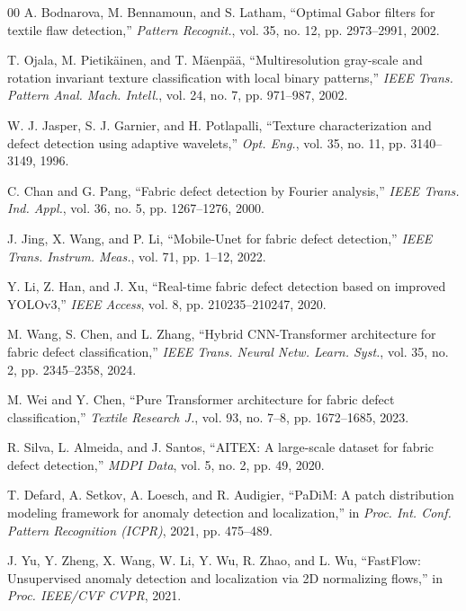 \documentclass[journal]{IEEEtran}
\begin{document}
\begin{thebibliography}{00}
A. Bodnarova, M. Bennamoun, and S. Latham, ``Optimal Gabor filters for textile flaw detection,'' \textit{Pattern Recognit.}, vol. 35, no. 12, pp. 2973--2991, 2002.

T. Ojala, M. Pietik\"ainen, and T. M\"aenp\"a\"a, ``Multiresolution gray-scale and rotation invariant texture classification with local binary patterns,'' \textit{IEEE Trans. Pattern Anal. Mach. Intell.}, vol. 24, no. 7, pp. 971--987, 2002.

W. J. Jasper, S. J. Garnier, and H. Potlapalli, ``Texture characterization and defect detection using adaptive wavelets,'' \textit{Opt. Eng.}, vol. 35, no. 11, pp. 3140--3149, 1996.

C. Chan and G. Pang, ``Fabric defect detection by Fourier analysis,'' \textit{IEEE Trans. Ind. Appl.}, vol. 36, no. 5, pp. 1267--1276, 2000.

J. Jing, X. Wang, and P. Li, ``Mobile-Unet for fabric defect detection,'' \textit{IEEE Trans. Instrum. Meas.}, vol. 71, pp. 1--12, 2022.

Y. Li, Z. Han, and J. Xu, ``Real-time fabric defect detection based on improved YOLOv3,'' \textit{IEEE Access}, vol. 8, pp. 210235--210247, 2020.

M. Wang, S. Chen, and L. Zhang, ``Hybrid CNN-Transformer architecture for fabric defect classification,'' \textit{IEEE Trans. Neural Netw. Learn. Syst.}, vol. 35, no. 2, pp. 2345--2358, 2024.

M. Wei and Y. Chen, ``Pure Transformer architecture for fabric defect classification,'' \textit{Textile Research J.}, vol. 93, no. 7--8, pp. 1672--1685, 2023.

R. Silva, L. Almeida, and J. Santos, ``AITEX: A large-scale dataset for fabric defect detection,'' \textit{MDPI Data}, vol. 5, no. 2, pp. 49, 2020.

T. Defard, A. Setkov, A. Loesch, and R. Audigier, ``PaDiM: A patch distribution modeling framework for anomaly detection and localization,'' in \textit{Proc. Int. Conf. Pattern Recognition (ICPR)}, 2021, pp. 475--489.

J. Yu, Y. Zheng, X. Wang, W. Li, Y. Wu, R. Zhao, and L. Wu, ``FastFlow: Unsupervised anomaly detection and localization via 2D normalizing flows,'' in \textit{Proc. IEEE/CVF CVPR}, 2021.


\end{thebibliography}
\end{document}
